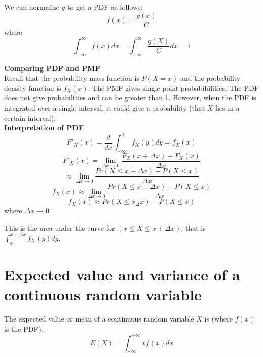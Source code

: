 We can normalize $g$ to get a PDF as follows:
$$f(x) = \frac{g(x)}{C}$$
where
$$\int_{-\infty}^{\infty} f(x) dx = \int_{-\infty}^{\infty} \frac{g(X)}{C} dx = 1$$



\textbf{Comparing PDF and PMF}\\
Recall that the probability mass function is $P(X = x)$ and the probability density function is $f_X (x)$. The PMF gives single point probabibilities. The PDF does not give probabilities and can be greater than 1. However, when the PDF is integrated over a single interval, it could give a probability (that $X$ lies in a certain interval).\\

\textbf{Interpretation of PDF}\\
$$F'_X (x) = \frac{d}{dx} \int_{-\infty}^{X} f_X (y) dy = f_X (x)$$
$$F'_X (x) = \lim_{\Delta x\to 0} \frac{F_X (x + \Delta x) - F_X (x)}{\Delta x}$$
$$\approx \lim_{\Delta x \to 0} \frac{Pr(X \le x + \Delta x) - P(X \le x)}{\Delta x}$$
$$f_X (x) \approx \lim_{\Delta x \to 0} \frac{Pr (X \le x + \Delta x) - P(X \le x)}{\Delta x}$$
$$f_X(x) \approx Pr (X \le x _ \Delta x) - P(X \le x)$$ where $\Delta x \rightarrow 0$

This is the area under the curve for $(x \le X \le x + \Delta x)$, that is $\int_{x}^{x + \Delta x} f_X (y) dy$.

\section{Expected value and variance of a continuous random variable}
The expected value or mean of a continuous random variable $X$ is (where $f(x)$ is the PDF):
$$E(X) = \int_{-\infty}^{+\infty} xf(x) dx$$

